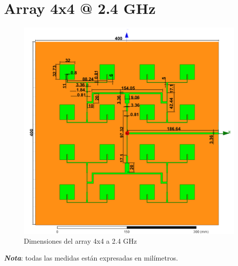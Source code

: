 \section{Array 4x4 @ 2.4 GHz}
\vfill
\begin{figure}[H]
   	 \centering
        \includegraphics[width=\textwidth ,height=\textheight, keepaspectratio=true]{archivos/desarrollo/autocad/10}
        \caption{Dimensiones del array 4x4 a 2.4 GHz}
        \label{fig:4x41}
\end{figure}
\vfill
\textit{\textbf{Nota}}: todas las medidas están expresadas en milímetros.
\newpage


